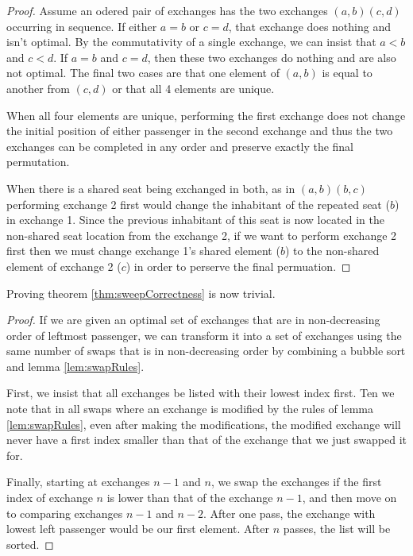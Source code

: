 \begin{proof}
Assume an odered pair of exchanges has the two exchanges $(a,b) (c,d)$ occurring in sequence. If either $a=b$ or $c=d$, that exchange does nothing and isn't optimal.  By the commutativity of a single exchange, we can insist that $a<b$ and $c<d$.  If $a=b$ and $c=d$, then these two exchanges do nothing and are also not optimal.  The final two cases are that one element of $(a,b)$ is equal to another from $(c,d)$ or that all 4 elements are unique.

When all four elements are unique, performing the first exchange does not change the initial position of either passenger in the second exchange and thus the two exchanges can be completed in any order and preserve exactly the final permutation.

When there is a shared seat being exchanged in both, as in $(a,b) (b,c)$ performing exchange 2 first would change the inhabitant of the repeated seat ($b$) in exchange 1.  Since the previous inhabitant of this seat is now located in the non-shared seat location from the exchange 2, if we want to perform exchange 2 first then we must change exchange 1's shared element ($b$) to the non-shared element of exchange 2 ($c$) in order to perserve the final permuation.
\end{proof}

Proving theorem \ref{thm:sweepCorrectness} is now trivial.

\begin{proof}
If we are given an optimal set of exchanges that are in non-decreasing order of leftmost passenger, we can transform it into a set of exchanges using the same number of swaps that is in non-decreasing order by combining a bubble sort and lemma \ref{lem:swapRules}.

First, we insist that all exchanges be listed with their lowest index first.  Ten we note that in all swaps where an exchange is modified by the rules of lemma \ref{lem:swapRules}, even after making the modifications, the modified exchange will never have a first index smaller than that of the exchange that we just swapped it for.

Finally, starting at exchanges $n-1$ and $n$, we swap the exchanges if the first index of exchange $n$ is lower than that of the exchange $n-1$, and then move on to comparing exchanges $n-1$ and $n-2$.  After one pass, the exchange with lowest left passenger would be our first element. After $n$ passes, the list will be sorted.
\end{proof}

